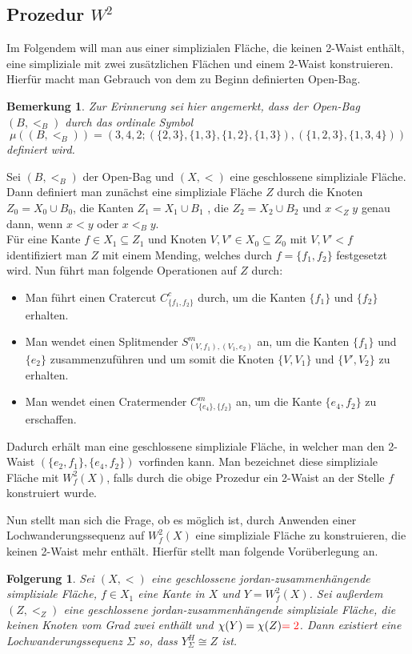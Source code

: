 \documentclass[12pt,titlepage]{article}
\newtheorem{folgerung}{Folgerung}[section]
\newtheorem{bemerkung}{Bemerkung}[section]
\begin{document}
 \subsection{Prozedur $W^2$}
Im Folgendem will man aus einer simplizialen Fläche, die keinen 2-Waist enthält, eine simpliziale mit zwei zusätzlichen Flächen und einem 2-Waist konstruieren. Hierfür macht man Gebrauch von dem zu Beginn definierten Open-Bag.
\begin{bemerkung}
Zur Erinnerung sei hier angemerkt, dass der Open-Bag $(B,<_B)$ durch das ordinale Symbol 
\[
\mu((B,<_B))=(3,4,2;(\{2,3\},\{1,3\},\{1,2\},\{1,3\}),(\{1,2,3\},\{1,3,4\}))
\] definiert wird.
\end{bemerkung}
 
Sei $(B,<_B)$ der Open-Bag und $(X,<)$ eine geschlossene simpliziale Fläche. Dann definiert man zunächst eine simpliziale Fläche $Z$ durch die Knoten $Z_0=X_0 \cup B_0$, die Kanten $Z_1=X_1 \cup B_1$ , die $Z_2=X_2 \cup B_2$ und $x<_Z y$ genau dann, wenn $x<y$ oder $x<_B y$.\\
Für eine Kante $f\in X_1 \subseteq Z_1$ und Knoten $V,V'\in X_0\subseteq Z_0$ mit $V,V'<f$ identifiziert man $Z$ mit einem Mending, welches durch $f=\{f_1,f_2\}$ festgesetzt wird.
 Nun führt man folgende Operationen auf $Z$ durch:
\begin{itemize}
\item Man führt einen Cratercut $C_{\{f_1,f_2\}}^c$ durch, um die Kanten $\{f_1\}$ und $\{f_2\}$ erhalten.
\item Man wendet einen Splitmender $S^m_{(V,{f_1}),(V_1,e_2)}$ an, um die Kanten $\{f_1\}$ und $\{e_2\}$ zusammenzuführen und um somit die Knoten $\{V,V_1\}$ und $\{V',V_2\}$ zu erhalten.
\item Man wendet einen Cratermender $C_{\{e_4\},\{f_2\}}^m$ an, um die Kante $\{e_4,f_2\}$ zu erschaffen.
\end{itemize}
Dadurch erhält man eine geschlossene simpliziale Fläche, in welcher man den 2-Waist $(\{e_2,f_1\},\{e_4,f_2\})$ vorfinden kann. Man bezeichnet diese simpliziale Fläche mit \emph{$W^2_f(X)$}, falls durch die obige Prozedur ein 2-Waist an der Stelle $f$ konstruiert wurde.

 Nun stellt man sich die Frage, ob es möglich ist, durch Anwenden einer Lochwanderungssequenz auf $W^2_f(X)$ eine simpliziale Fläche zu konstruieren, die keinen 2-Waist mehr enthält. Hierfür stellt man folgende Vorüberlegung an.
 

\begin{folgerung}
Sei $(X,<)$ eine geschlossene jordan-zusammenhängende simpliziale Fläche, $f\in X_1$ eine Kante in $X$ und $Y=W^2_f(X)$. Sei außerdem $(Z,<_Z)$ eine geschlossene jordan-zusammenhängende simpliziale Fläche, die keinen Knoten vom Grad zwei enthält und $\chi(Y)=\chi(Z)\textcolor{red}{=2}$. Dann existiert eine Lochwanderungssequenz $\Sigma$ so, dass $Y_{\Sigma}^H \cong Z$ ist.
\end{folgerung}
\end{document}
